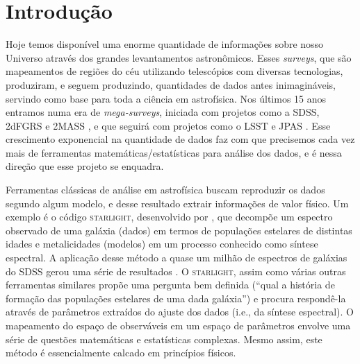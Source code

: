 \documentclass[a4paper,12pt]{article}
\def\starlight{\textsc{starlight}\xspace}      %
\def\SDSS{SDSS\xspace}           %
\begin{document}
\section{Introdução}
\vspace{0.3cm}
Hoje temos disponível uma enorme quantidade de informações sobre nosso Universo através dos grandes levantamentos astronômicos. Esses {\em surveys},
que são mapeamentos de regiões do céu utilizando telescópios com diversas tecnologias, produziram, e seguem produzindo, quantidades de dados antes
inimagináveis, servindo como base para toda a ciência em astrofísica. Nos últimos 15 anos entramos numa era de {\em mega-surveys}, iniciada com
projetos como a \SDSS \citep{York2000}, 2dFGRS \citep{Colless1999} e 2MASS \citep{Skrutskie2006}, e que seguirá com projetos como o LSST
\citep{Ivezic2008} e JPAS \citep{JPAS2014}. Esse crescimento exponencial na quantidade de dados faz com que precisemos cada vez mais de ferramentas
matemáticas/estatísticas para análise dos dados, e é nessa direção que esse projeto se enquadra.
	
Ferramentas clássicas de análise em astrofísica buscam reproduzir os dados segundo algum modelo, e desse resultado extrair informações de valor
físico. Um exemplo é o código \starlight, desenvolvido por \citet{CidFernandes2005}, que decompõe um espectro observado de uma galáxia (dados) em
termos de populações estelares de distintas idades e metalicidades (modelos) em um processo conhecido como síntese espectral. A aplicação desse método
a quase um milhão de espectros de galáxias do \SDSS gerou uma série de resultados \citep[e.g., ][]{Asari2007, Asari2009, CidFernandes2007,
Mateus2007}. O \starlight, assim como várias outras ferramentas similares \citep{Panter2003, Gallazzi2005, Ocvirk2006} propõe uma pergunta bem
definida (``qual a história de formação das populações estelares de uma dada galáxia'') e procura respondê-la através de parâmetros extraídos do
ajuste dos dados (i.e., da síntese espectral). O mapeamento do espaço de observáveis em um espaço de parâmetros envolve uma série de questões
matemáticas e estatísticas complexas. Mesmo assim, este método é essencialmente calcado em princípios físicos.
\end{document}
